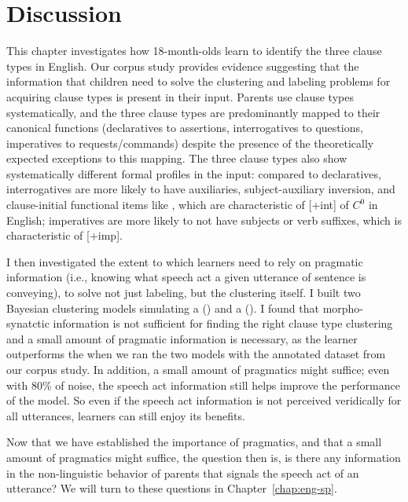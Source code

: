 \section{Discussion}
\label{sec:engcl:discussion}

This chapter investigates how 18-month-olds learn to identify the three clause types in English. Our corpus study provides evidence suggesting that the information that children need to solve the clustering and labeling problems for acquiring clause types is present in their input. Parents use clause types systematically, and the three clause types are predominantly mapped to their canonical functions (declaratives to assertions, interrogatives to questions, imperatives to requests/commands) despite the presence of the theoretically expected exceptions to this mapping. The three clause types also show systematically different formal profiles in the input: compared to declaratives, interrogatives are more likely to have auxiliaries, subject-auxiliary inversion, and clause-initial functional items like \twh{}, which are characteristic of [+int] of $C^{0}$ in English; imperatives are more likely to not have subjects or verb suffixes, which is characteristic of [+imp].


I then investigated the extent to which learners need to rely on pragmatic information (i.e., knowing what speech act a given utterance of sentence is conveying), to solve not just labeling, but the clustering itself. I built two Bayesian clustering models simulating a \distlearner{} (\dlearnerabbr{}) and a \praglearner{} (\plearnerabbr{}). I found that morpho-synatctic information is not sufficient for finding the right clause type clustering and a small amount of pragmatic information is necessary, as the \plearnerabbr{} learner outperforms the \dlearnerabbr{} when we ran the two models with the annotated dataset from our corpus study. In addition, a small amount of pragmatics might suffice; even with 80\% of noise, the speech act information still helps improve the performance of the model. So even if the speech act information is not perceived veridically for all utterances, learners can still enjoy its benefits.

Now that we have established the importance of pragmatics, and that a small amount of pragmatics might suffice, the question then is, is there any information in the non-linguistic behavior of parents that signals the speech act of an utterance? We will turn to these questions in Chapter~\ref{chap:eng-sp}.


